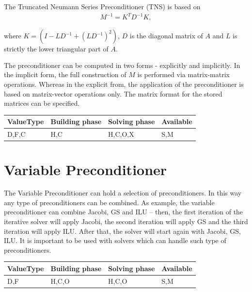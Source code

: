 The Truncated Neumann Series Preconditioner (TNS) is based on
\begin{eqnarray}
M^{-1} = K^T D^{-1} K,
\end{eqnarray}

where $K = (I - LD^{-1} + (LD^{-1})^2)$, $D$ is the diagonal matrix of $A$ and $L$ is strictly the lower triangular part of $A$.

The preconditioner can be computed in two forms - explicitly and implicitly. In the implicit form, the full construction of $M$ is performed via matrix-matrix operations. Whereas in the explicit from, the application of the preconditioner is based on matrix-vector operations only. The matrix format for the stored matrices can be specified.

\begin{table}[H]
\begin{tabular}{l|l|l|l}
\multicolumn{1}{c|}{ValueType} & Building phase & Solving phase & Available \\ \hline
D,F,C                          & H,C            & H,C,O,X       & S,M      
\end{tabular}
\end{table}




\section{Variable Preconditioner}

The Variable Preconditioner can hold a selection of preconditioners. In this way any type of preconditioners can be combined. As example, the variable preconditioner can combine Jacobi, GS and ILU -- then, the first iteration of the iterative solver will apply Jacobi, the second iteration will apply GS and the third iteration will apply ILU. After that, the solver will start again with Jacobi, GS, ILU. It is important to be used with solvers which can handle such type of preconditioners.

\begin{table}[H]
\begin{tabular}{l|l|l|l}
\multicolumn{1}{c|}{ValueType} & Building phase & Solving phase & Available \\ \hline
D,F                            & H,C,O          & H,C,O         & S,M      
\end{tabular}
\end{table}


